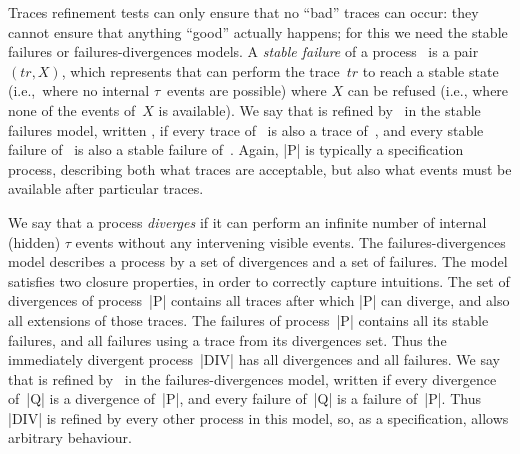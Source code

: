 Traces refinement tests can only ensure that no ``bad'' traces can occur: they
cannot ensure that anything ``good'' actually happens; for this we need the
stable failures or failures-divergences models.  A \emph{stable failure} of a
process~ is a pair $(tr,X)$, which represents that  can
perform the trace~$tr$ to reach a stable state (i.e.,~where no internal
$\tau$~events are possible) where $X$ can be refused (i.e., where none of the
events of~$X$ is available).  We say that  is refined by~ in
the stable failures model, written \CSPM{P [F= Q}, if every trace of~
is also a trace of~, and every stable failure of~ is also a
stable failure of~.  Again, |P| is typically a specification process,
describing both what traces are acceptable, but also what events must be
available after particular traces.

We say that a process \emph{diverges} if it can perform an infinite number of
internal (hidden) $\tau$ events without any intervening visible events.  The
failures-divergences model describes a process by a set of divergences and a
set of failures.  The model satisfies two closure properties, in order to
correctly capture intuitions.  The set of divergences of process~|P| contains
all traces after which |P| can diverge, and also all extensions of those
traces.  The failures of process~|P| contains all its stable failures, and all
failures using a trace from its divergences set.  Thus the immediately
divergent process~|DIV| has all divergences and all failures.  We say that
 is refined by~ in the failures-divergences model, written
\CSPM{P [FD= Q}
if every divergence of~|Q| is a divergence of~|P|, and every failure of~|Q| is
a failure of~|P|.  Thus |DIV| is refined by every other process in this model,
so, as a specification, allows arbitrary behaviour.






